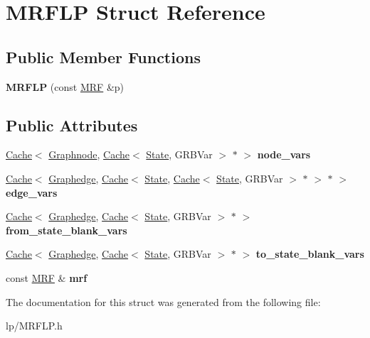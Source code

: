 \hypertarget{struct_m_r_f_l_p}{
\section{MRFLP Struct Reference}
\label{struct_m_r_f_l_p}
}
\subsection*{Public Member Functions}
\begin{DoxyCompactItemize}
\item 
\hypertarget{struct_m_r_f_l_p_a868a64efdbf8d42682c7953361af4c31}{
{\bfseries MRFLP} (const \hyperlink{class_m_r_f}{MRF} \&p)}
\label{struct_m_r_f_l_p_a868a64efdbf8d42682c7953361af4c31}

\end{DoxyCompactItemize}
\subsection*{Public Attributes}
\begin{DoxyCompactItemize}
\item 
\hypertarget{struct_m_r_f_l_p_a1ddb2cc0eb980dc0d9d94bf731e3f4ae}{
\hyperlink{class_cache}{Cache}$<$ \hyperlink{class_scarab_1_1_graph_1_1_graphnode}{Graphnode}, \hyperlink{class_cache}{Cache}$<$ \hyperlink{struct_state}{State}, GRBVar $>$ $\ast$ $>$ {\bfseries node\_\-vars}}
\label{struct_m_r_f_l_p_a1ddb2cc0eb980dc0d9d94bf731e3f4ae}

\item 
\hypertarget{struct_m_r_f_l_p_a7f977d31ba7f70b5913279466a46e2b2}{
\hyperlink{class_cache}{Cache}$<$ \hyperlink{class_scarab_1_1_graph_1_1_graphedge}{Graphedge}, \hyperlink{class_cache}{Cache}$<$ \hyperlink{struct_state}{State}, \hyperlink{class_cache}{Cache}$<$ \hyperlink{struct_state}{State}, GRBVar $>$ $\ast$ $>$ $\ast$ $>$ {\bfseries edge\_\-vars}}
\label{struct_m_r_f_l_p_a7f977d31ba7f70b5913279466a46e2b2}

\item 
\hypertarget{struct_m_r_f_l_p_a46a1042ee20d632ca11afee0a1965fb9}{
\hyperlink{class_cache}{Cache}$<$ \hyperlink{class_scarab_1_1_graph_1_1_graphedge}{Graphedge}, \hyperlink{class_cache}{Cache}$<$ \hyperlink{struct_state}{State}, GRBVar $>$ $\ast$ $>$ {\bfseries from\_\-state\_\-blank\_\-vars}}
\label{struct_m_r_f_l_p_a46a1042ee20d632ca11afee0a1965fb9}

\item 
\hypertarget{struct_m_r_f_l_p_ae1b4c653d4a3b3c6759a160f8f1c4fc6}{
\hyperlink{class_cache}{Cache}$<$ \hyperlink{class_scarab_1_1_graph_1_1_graphedge}{Graphedge}, \hyperlink{class_cache}{Cache}$<$ \hyperlink{struct_state}{State}, GRBVar $>$ $\ast$ $>$ {\bfseries to\_\-state\_\-blank\_\-vars}}
\label{struct_m_r_f_l_p_ae1b4c653d4a3b3c6759a160f8f1c4fc6}

\item 
\hypertarget{struct_m_r_f_l_p_a546b7ee8de350e2a882e9ae9beb6af6f}{
const \hyperlink{class_m_r_f}{MRF} \& {\bfseries mrf}}
\label{struct_m_r_f_l_p_a546b7ee8de350e2a882e9ae9beb6af6f}

\end{DoxyCompactItemize}


The documentation for this struct was generated from the following file:\begin{DoxyCompactItemize}
\item 
lp/MRFLP.h\end{DoxyCompactItemize}
